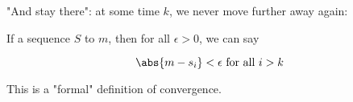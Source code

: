     "And stay there": at some time $k$, we never move further away again:\\
    
    \begin{definition}
        If a sequence $S$  to $m$, then for all $\epsilon>0$, we can say
        
        \begin{equation}
            \abs{m-s_i}<\epsilon \text{ for all } i>k
        \end{equation}
    
    \end{definition}
    
    This is a "formal" definition of convergence.
    